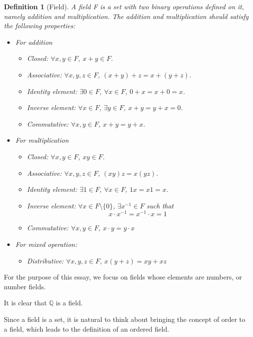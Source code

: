 \documentclass[onecolumn]{article}
\newtheorem{definition}{Definition}
\begin{document}
\begin{definition}[Field]
  A field F is a set with two binary operations defined on it, namely addition and
  multiplication. The addition and multiplication should satisfy the following
  properties:
  \begin{itemize}
    \item For addition
    \begin{itemize}
      \item Closed: $\forall x, y \in F$, $x + y \in F$.
      \item Associative: $\forall x, y, z \in F$, $(x + y) + z = x + (y + z)$.
      \item Identity element: $\exists 0 \in F$, $\forall x \in F$, $0 + x = x + 0 = x$.
      \item Inverse element: $\forall x \in F$, $\exists y \in F$, $x + y = y + x = 0$.
      \item Commutative: $\forall x, y \in F$, $x + y = y + x$.
    \end{itemize}
    \item For multiplication
    \begin{itemize}
      \item Closed: $\forall x, y \in F$, $xy \in F$.
      \item Associative: $\forall x, y, z \in F$, $(xy)z = x(yz)$.
      \item Identity element: $\exists 1 \in F$, $\forall x \in F$, $1x = x1 = x$.
      \item Inverse element: $\forall x \in F \setminus \{0\}$, $\exists x^{-1} \in F$ such that
      \[
        x \cdot x^{-1} = x^{-1} \cdot x = 1
      \]
      \item Commutative: $\forall x, y \in F$, $x \cdot y = y \cdot x$
    \end{itemize}
    \item For mixed operation:
    \begin{itemize}
      \item Distributive: $\forall x, y, z \in F$, $x(y + z) = xy + xz$
    \end{itemize}
  \end{itemize}
\end{definition}

For the purpose of this essay, we focus on fields whose elements are numbers, or
number fields.

It is clear that $\mathbb{Q}$ is a field. 

Since a field is a set, it is natural to think about bringing the concept of 
order to a field, which leads to the definition of an ordered field.
\end{document}
